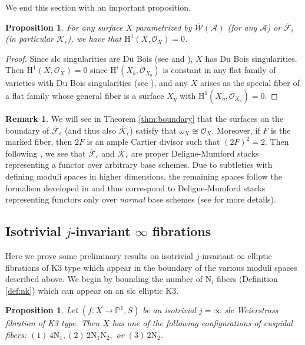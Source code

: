 \documentclass[11pt]{amsart}
\newtheorem{prop}[theorem]{Proposition}
\theoremstyle{definition}
\newtheorem{remark}[theorem]{Remark}
\theoremstyle{remark}
\newcommand{\calO}{\mathcal O}
\newcommand{\calA}{\mathcal A}
\newcommand{\calW}{\mathcal W}
\newcommand{\ka}{\overline{\calW}(\calA)}
\newcommand{\ke}{\overline{\mathcal{K}}_{\epsilon}}
\newcommand{\fe}{\overline{\mathcal{F}}_\epsilon}
\newcommand{\km}{\fe}
\begin{document}
	We end this section with an important proposition. 
	
	\begin{prop}\label{obvs:dubois}For any surface $X$ parametrized by $\ka$ (for any $\calA$) or $\km$ (in particular $\ke$), we have that $\mathrm{H}^1(X, \calO_X) = 0$. \end{prop}
	
	\begin{proof}Since slc singularities are Du Bois (see \cite{kk} and \cite[Corollary 6.32]{singmmp}), $X$ has Du Bois singularities. Then $\mathrm{H}^1(X, \calO_X) = 0$ since $\mathrm{H}^i(X_b, \calO_{X_b})$ is constant in any flat family of varieties with Du Bois singularities (see \cite[Corollary 1.2]{kk}), and any $X$ arises as the special fiber of a flat family whose general fiber is a surface $X_\eta$ with $\mathrm{H}^1(X_\eta, \calO_{X_\eta}) = 0$. \end{proof}
	
	\begin{remark} We will see in Theorem \ref{thm:boundary} that the surfaces on the boundary of $\km$ (and thus also $\ke$) satisfy that $\omega_X \cong \calO_X$. Moreover, if $F$ is the marked fiber, then $2F$ is an ample Cartier divisor such that $(2F)^2 = 2$. Then following \cite[Definition 3.4, Proposition 3.8, and Theorem 3.11]{aet}, we see that $\km$ and $\ke$ are proper Deligne-Mumford stacks representing a functor over arbitrary base schemes. Due to subtleties with defining moduli spaces in higher dimensions, the remaining spaces follow the formalism developed in \cite{master} and thus correspond to Deligne-Mumford stacks representing functors only over \emph{normal} base schemes (see \cite[Section 2.2.2]{master} for more details). \end{remark} 
	
	
	
	\subsection{Isotrivial $j$-invariant $\infty$ fibrations}\label{sec:jinfty}
	
	Here we prove some preliminary results on isotrivial $j$-invariant $\infty$ elliptic fibrations of K3 type which appear in the boundary of the various moduli spaces described above. We begin by bounding the number of $\mathrm{N}_i$ fibers (Definition \ref{def:nk}) which can appear on an slc elliptic K3.
	
	\begin{prop}\label{prop:k3typejinfty} Let $(f : X \to \mathbb{P}^1,S)$ be an isotrivial $j = \infty$ slc Weierstrass fibration of K3 type. Then $X$ has one of the following configurations of cuspidal fibers: $(1) \,   4\mathrm{N}_1, (2) \,   2\mathrm{N}_1\mathrm{N}_2,$ or $(3) \,  2\mathrm{N}_2$.
	\end{prop} 
	
\end{document}
